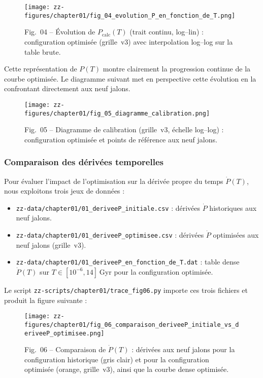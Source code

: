 \begin{figure}[htbp]
  \centering
  \texttt{[image: zz-figures/chapter01/fig\_04\_evolution\_P\_en\_fonction\_de\_T.png]}
  \caption{Fig.~04 – Évolution de \(P_{\mathrm{calc}}(T)\) (trait continu, log–lin) :
           configuration optimisée (grille~v3) avec interpolation log–log sur la table brute.}
  \label{fig:p_vs_t_calibration}
\end{figure}

Cette représentation de \(P(T)\) montre clairement la progression continue de la courbe optimisée.
Le diagramme suivant met en perspective cette évolution en la confrontant directement aux neuf jalons.

\begin{figure}[htbp]
  \centering
  \texttt{[image: zz-figures/chapter01/fig\_05\_diagramme\_calibration.png]}
  \caption{Fig.~05 – Diagramme de calibration (grille~v3, échelle log–log) :
           configuration optimisée et points de référence aux neuf jalons.}
  \label{fig:diagramme_calibration}
\end{figure}

\subsubsection{Comparaison des dérivées temporelles}

Pour évaluer l’impact de l’optimisation sur la dérivée propre du temps \(\dot P(T)\),
nous exploitons trois jeux de données :

\begin{itemize}
  \item \texttt{zz-data/chapter01/01\_deriveeP\_initiale.csv} :
        dérivées \(\dot P\) historiques aux neuf jalons.
  \item \texttt{zz-data/chapter01/01\_deriveeP\_optimisee.csv} :
        dérivées \(\dot P\) optimisées aux neuf jalons (grille~v3).
  \item \texttt{zz-data/chapter01/01\_deriveeP\_en\_fonction\_de\_T.dat} :
        table dense \(\dot P(T)\) sur \(T\in[10^{-6},14]\) Gyr pour la configuration optimisée.
\end{itemize}

Le script \texttt{zz-scripts/chapter01/trace\_fig06.py} importe ces trois fichiers
et produit la figure suivante :

\begin{figure}[htbp]
  \centering
  \texttt{[image: zz-figures/chapter01/fig\_06\_comparaison\_deriveeP\_initiale\_vs\_deriveeP\_optimisee.png]}
  \caption{Fig.~06 – Comparaison de \(\dot P(T)\) :
           dérivées aux neuf jalons pour la configuration historique (gris clair)
           et pour la configuration optimisée (orange, grille~v3), ainsi que la courbe dense optimisée.}
  \label{fig:comparaison_deriveeP}
\end{figure}

